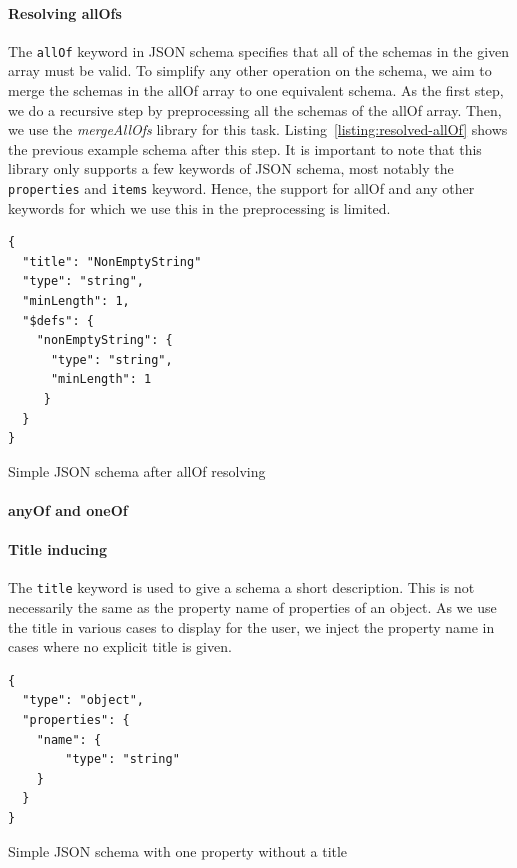 \paragraph{Resolving allOfs}

The \texttt{allOf} keyword in JSON schema specifies that all of the schemas in the given array must be valid.
To simplify any other operation on the schema, we aim to merge the schemas in the allOf array to one equivalent schema.
As the first step, we do a recursive step by preprocessing all the schemas of the allOf array.
Then, we use the \textit{mergeAllOfs} library %
for this task.
Listing~\ref{listing:resolved-allOf} shows the previous example schema after this step.
It is important to note that this library only supports a few keywords of JSON schema, most notably the
\texttt{properties} and \texttt{items} keyword.
Hence, the support for allOf and any other keywords for which we use this in the preprocessing is limited.

\begin{listing}[!h]
    \begin{verbatim}
{
  "title": "NonEmptyString"
  "type": "string",
  "minLength": 1,
  "$defs": {
    "nonEmptyString": {
      "type": "string",
      "minLength": 1
     }
  }
}
    \end{verbatim}
    \caption{Simple JSON schema after allOf resolving}
    \label{listing:resolved-allOf}
\end{listing}

\paragraph{anyOf and oneOf} %

\paragraph{Title inducing}

The \texttt{title} keyword is used to give a schema a short description.
This is not necessarily the same as the property name of properties of an object.
As we use the title in various cases to display for the user, we inject the property name in cases where no explicit title is given.

\begin{listing}[!h]
    \begin{verbatim}
{
  "type": "object",
  "properties": {
    "name": {
        "type": "string"
    }
  }
}
    \end{verbatim}
    \caption{Simple JSON schema with one property without a title}
    \label{listing:no-title}
\end{listing}

